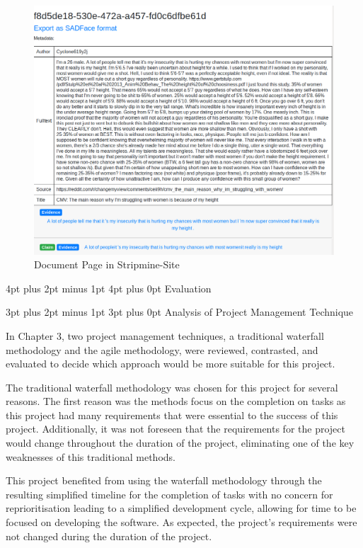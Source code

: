 \documentclass[12pt,a4paper]{article}
\makeatletter
\renewcommand\subsection{\@startsection {subsection}{1}{2mm} %
                               {3pt plus 2pt minus 1pt} %
                               {3pt plus 0pt} %
                               {\normalfont\bfseries}}
\renewcommand\section{\@startsection {section}{1}{0mm} %
                               {4pt plus 2pt minus 1pt} %
                               {4pt plus 0pt} %
                               {\bfseries}}
\makeatother
\begin{document}
\begin{figure}[H]
    \centering
    \includegraphics[scale=0.4]{Report/graphics/document.png}
    \caption{Document Page in Stripmine-Site}
    \label{fig:document}
\end{figure}

\newpage
\section{Evaluation}

\subsection{Analysis of Project Management Technique}

In Chapter 3, two project management techniques, a traditional waterfall methodology and the agile methodology, were reviewed, contrasted, and evaluated to decide which approach would be more suitable for this project.

The traditional waterfall methodology was chosen for this project for several reasons. The first reason was the methods focus on the completion on tasks as this project had many requirements that were essential to the success of this project. Additionally, it was not foreseen that the requirements for the project would change throughout the duration of the project, eliminating one of the key weaknesses of this traditional methods.

This project benefited from using the waterfall methodology through the resulting simplified timeline for the completion of tasks with no concern for reprioritisation leading to a simplified development cycle, allowing for time to be focused on developing the software. As expected, the project's requirements were not changed during the duration of the project.
\end{document}

